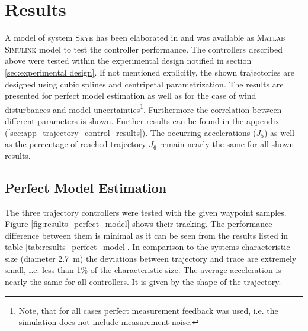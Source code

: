 \section{Results}
\label{sec:results}

A model of system \textsc{Skye} has been elaborated in \cite{weichart} and was available as \textsc{Matlab Simulink} model to test the controller performance. The controllers described above were tested within the experimental design notified in section \ref{sec:experimental design}. If not mentioned explicitly, the shown trajectories are designed using cubic splines and centripetal parametrization. The results are presented for perfect model estimation as well as for the case of wind disturbances and model uncertainties\footnote{Note, that for all cases perfect measurement feedback was used, i.e. the simulation does not include measurement noise.}. Furthermore the correlation between different parameters is shown. Further results can be found in the appendix (\ref{sec:app_trajectory_control_results}). 
The occurring accelerations ($J_5$) as well as the percentage of reached trajectory $J_6$ remain nearly the same for all shown results.

\subsection{Perfect Model Estimation}
\label{sub:results_perfect_model}

The three trajectory controllers were tested with the given waypoint samples. Figure \ref{fig:results_perfect_model} shows their tracking. The performance difference between them is minimal as it can be seen from the results listed in table \ref{tab:results_perfect_model}. In comparison to the systems characteristic size (diameter \SI{2.7}{\meter}) the deviations between trajectory and trace are extremely small, i.e. less than 1\% of the characteristic size. The average acceleration is nearly the same for all controllers. It is given by the shape of the trajectory.


